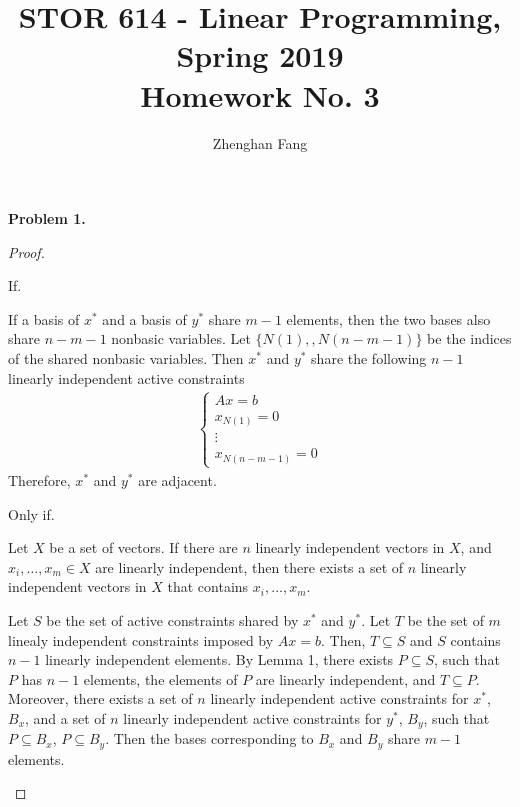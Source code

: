 \documentclass[12pt]{article}
\newenvironment{lemma}[2][Lemma]{\begin{trivlist}
\item[\hskip \labelsep {\bfseries #1}\hskip \labelsep {\bfseries #2.}]}{\end{trivlist}}
\def\name{Zhenghan Fang}
\begin{document}
 


\title{STOR 614 - Linear Programming, Spring 2019 \\
Homework No. 3}
\author{\name}

\maketitle

\noindent
\textbf{Problem 1.}

\begin{proof}
~
\begin{enumerate}
\item If.

If a basis of $x^*$ and a basis of $y^*$ share $m-1$ elements, then the two bases also share $n-m-1$ nonbasic variables. Let $\{N(1),  ,N(n-m-1)\}$ be the indices of the shared nonbasic variables. Then $x^*$ and $y^*$ share the following $n-1$ linearly independent active constraints
\begin{align*}
    \begin{cases}
    Ax=b \\
    x_{N(1)} = 0 \\
    \vdots \\
    x_{N(n-m-1)} = 0
    \end{cases}
\end{align*}
Therefore, $x^*$ and $y^*$ are adjacent.

\item Only if.
\begin{lemma}{1}
Let $X$ be a set of vectors. If there are $n$ linearly independent vectors in $X$, and $x_i, \hdots, x_m \in X$ are linearly independent, then there exists a set of $n$ linearly independent vectors in $X$ that contains $x_i, \hdots, x_m$.
\end{lemma}

Let $S$ be the set of active constraints shared by $x^*$ and $y^*$. Let $T$ be the set of $m$ linealy independent constraints imposed by $Ax=b$. Then, $T \subseteq S$ and $S$ contains $n-1$ linearly independent elements. By Lemma 1, there exists $P \subseteq S$, such that $P$ has $n-1$ elements, the elements of $P$ are linearly independent, and $T \subseteq P$. Moreover, there exists a set of $n$ linearly independent active constraints for $x^*$, $B_x$, and a set of $n$ linearly independent active constraints for $y^*$, $B_y$, such that $P \subseteq B_x$, $P \subseteq B_y$. Then the bases corresponding to $B_x$ and $B_y$ share $m-1$ elements.
\end{enumerate}
\end{proof}
\end{document}
